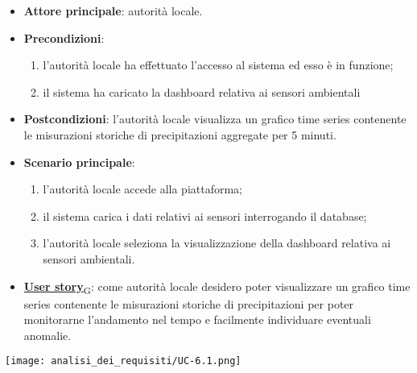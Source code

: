 \begin{itemize}
	\item \textbf{Attore principale}: autorità locale.
	\item \textbf{Precondizioni}:
	      \begin{enumerate}
		      \item l'autorità locale ha effettuato l'accesso al sistema ed esso è in funzione;
		      \item il sistema ha caricato la dashboard relativa ai sensori ambientali
	      \end{enumerate}
	\item \textbf{Postcondizioni}: l'autorità locale visualizza un grafico time series contenente le misurazioni storiche
	      di precipitazioni aggregate per 5 minuti.
	\item \textbf{Scenario principale}:
	      \begin{enumerate}
		      \item l'autorità locale accede alla piattaforma;
		      \item il sistema carica i dati relativi ai sensori interrogando il database;
		      \item l'autorità locale seleziona la visualizzazione della dashboard relativa ai sensori ambientali.
	      \end{enumerate}
	\item \href{https://7last.github.io/docs/rtb/documentazione-interna/glossario\#user-story}{\textbf{User story}\textsubscript{G}}:
	      come autorità locale desidero poter visualizzare un grafico time series contenente le misurazioni storiche
	      di precipitazioni per poter monitorarne l'andamento nel tempo e facilmente individuare eventuali anomalie.
\end{itemize}
\begin{center}
	\texttt{[image: analisi\_dei\_requisiti/UC-6.1.png]}
\end{center}


